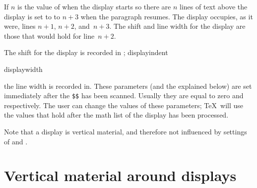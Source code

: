 \documentclass[twoside,letterpaper,openright]{rapport3}
\begin{document}
If $n$ is the value of  when the display starts
\ldash so there are $n$ lines of text above the display \rdash 
{} is set to to $n+3$ when the paragraph resumes.
The display occupies, as it were, lines $n+1$, $n+2$, and~$n+3$.
The shift and line width for the display are those
that would hold for line~$n+2$.

The shift for the display is recorded in ;
\cstoidx displayindent\par\cstoidx displaywidth\par
the line width is recorded in\handbreak {}. These parameters
(and the  explained below)
are set immediately after the \verb>$$> has been scanned.
Usually they are equal to zero and  respectively.
The user can change the values of these parameters; 
\TeX\ will use the
values that hold after the math list 
of the display has been processed.

Note that a display is vertical material, and therefore
not influenced by settings of  and .

\section{Vertical material around displays}
\end{document}
